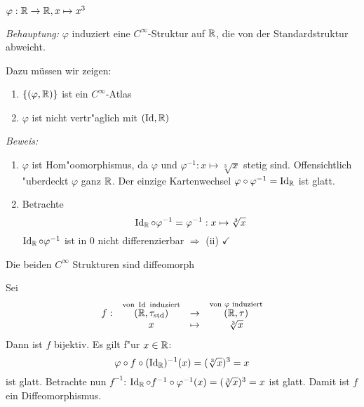 \begin{Loes}
$\varphi: \operatorname{\mathbb{R}} \to \operatorname{\mathbb{R}}, x \mapsto x^3$

\emph{Behauptung:} $\varphi$ induziert eine $C^\infty$-Struktur auf $\operatorname{\mathbb{R}}$, die von der Standardstruktur abweicht.

Dazu müssen wir zeigen:\begin{enumerate}[font=\normalfont,label=(\roman*)]
\item
	$\{(\varphi, \operatorname{\mathbb{R}})\}$ ist ein $C^\infty$-Atlas
\item
	$\varphi$ ist nicht vertr"aglich mit $(\operatorname{Id}, \operatorname{\mathbb{R}})$
\end{enumerate}
\emph{Beweis:}\begin{enumerate}[leftmargin=*,widest=ii,font=\normalfont,label=(\roman*)]
\item
	$\varphi$ ist Hom"oomorphismus, da $\varphi$ und $\varphi^{-1}: x \mapsto \sqrt[3]{x}$ stetig sind. Offensichtlich "uberdeckt $\varphi$ ganz $\operatorname{\mathbb{R}}$. Der einzige Kartenwechsel $\varphi \circ \varphi^{-1} = \operatorname{Id}_{\operatorname{\mathbb{R}}}$ ist glatt.
\item
	Betrachte
		\[ \operatorname{Id}_{\operatorname{\mathbb{R}}} \circ \varphi^{-1} = \varphi^{-1}: x \mapsto \sqrt[3]{x} \]
	$\operatorname{Id}_{\operatorname{\mathbb{R}}} \circ \varphi^{-1}$ ist in $0$ nicht differenzierbar $\Rightarrow$ (ii) $\checkmark$
\end{enumerate}
\begin{description}[font=\normalfont\itshape]
\item[Behauptung:]
	Die beiden $C^\infty$ Strukturen sind diffeomorph
\item[Beweis:]
	Sei
		\[\begin{array}{cccc} f:&  \overset{\text{von } \operatorname{Id} \text{ induziert}}{(\operatorname{\mathbb{R}}, \tau_{\text{std}})} &\to& \overset{\text{von } \varphi \text{ induziert}}{(\operatorname{\mathbb{R}}, \tau)} \\
			& x &\mapsto& \sqrt[3]{x} \end{array}\]
	Dann ist $f$ bijektiv. Es gilt f"ur $x \in \operatorname{\mathbb{R}}$:
		\[ \varphi \circ f \circ (\operatorname{Id}_{\operatorname{\mathbb{R}}})^{-1} (x) = (\sqrt[3]{x})^3 = x \]
	ist glatt. Betrachte nun $f^{-1}$: $\operatorname{Id}_{\operatorname{\mathbb{R}}} \circ f^{-1} \circ \varphi^{-1}(x) = (\sqrt[3]{x})^3 = x$ ist glatt. Damit ist $f$ ein Diffeomorphismus.
\end{description}
\end{Loes}

